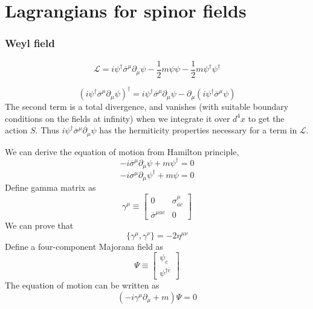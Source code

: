 \section{Lagrangians for spinor fields}
\subsubsection{Weyl field}
\[\mathcal{L} = i \psi^{\dagger} \overline{\sigma}^{\mu} \partial_{\mu} \psi - \frac{1}{2}m \psi \psi - \frac{1}{2}m \psi^{\dagger} \psi^{\dagger}\]
\begin{note}
\[(i \psi^{\dagger} \overline{\sigma}^{\mu} \partial_{\mu} \psi)^{\dagger} = i \psi^{\dagger} \overline{\sigma}^{\mu} \partial_{\mu} \psi - \partial_{\mu}(i \psi^{\dagger} \overline{\sigma}^{\mu} \psi)\]
The second term is a total divergence, and vanishes (with suitable boundary conditions on the fields at infinity) when we integrate it over $d^4 x$ to get the action $S$. Thus $i \psi^{\dagger} \overline{\sigma}^{\mu} \partial_{\mu} \psi$  has the hermiticity properties necessary for a term in $\mathcal{L}$.
\end{note}
\noindent
We can derive the equation of motion from Hamilton principle,
\[-i\overline{\sigma}^{\mu} \partial_{\mu} \psi + m \psi^{\dagger} = 0\]
\[-i\sigma^{\mu} \partial_{\mu} \psi^{\dagger} + m \psi = 0\]
Define gamma matrix as
\[\gamma^{\mu} \equiv \left[ \begin{matrix} 0& \sigma^{\mu}_{a\dot{c}}\\ \overline{\sigma}^{\mu\dot{a}c}& 0\end{matrix} \right] \]
We can prove that
\[\{\gamma^{\mu},\gamma^{\nu}\} = -2\eta^{\mu\nu}\]
Define a four-component Majorana field as
\[\Psi \equiv \left[ \begin{matrix} \psi_c \\ \psi^{\dagger \dot{c}}\end{matrix} \right] \]
The equation of motion can be written as
\[(-i\gamma^{\mu}\partial_{\mu}+m)\Psi=0\]

